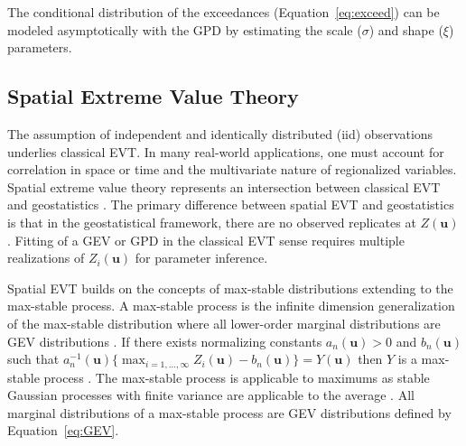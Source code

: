 The conditional distribution of the exceedances (Equation~\ref{eq:exceed}) can be modeled asymptotically with the GPD by estimating the scale ($\sigma$) and shape ($\xi$) parameters.

\FloatBarrier
\subsection{Spatial Extreme Value Theory}
\label{subsec:01spevt}

The assumption of independent and identically distributed (iid) observations underlies classical EVT. In many real-world applications, one must account for correlation in space or time and the multivariate nature of regionalized variables. Spatial extreme value theory represents an intersection between classical EVT and geostatistics \citep{neves2015geostatistical}. The primary difference between spatial EVT and geostatistics is that in the geostatistical framework, there are no observed replicates at $Z(\mathbf{u})$. Fitting of a GEV or GPD in the classical EVT sense requires multiple realizations of $Z_i(\mathbf{u})$ for parameter inference.

Spatial EVT builds on the concepts of max-stable distributions extending to the max-stable process. A max-stable process is the infinite dimension generalization of the max-stable distribution where all lower-order marginal distributions are GEV distributions \citep{schlather2003dependence}. If there exists normalizing constants $a_n(\mathbf{u}) > 0$ and $b_n(\mathbf{u})$ such that $a_n^{-1}(\mathbf{u})\{\max_{i=1,...,\infty} Z_i(\mathbf{u}) - b_n(\mathbf{u})\} = Y(\mathbf{u})$ then $Y$ is a max-stable process \citep{dehaan2007extreme}. The max-stable process is applicable to maximums as stable Gaussian processes with finite variance are applicable to the average \citep{chiles2012geostatistics}. All marginal distributions of a max-stable process are GEV distributions defined by Equation~\ref{eq:GEV}.



